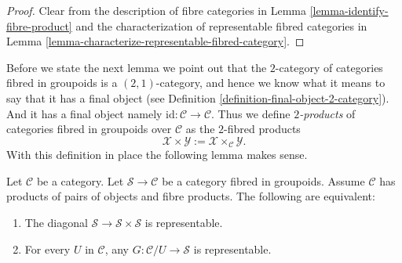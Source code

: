\begin{proof}
Clear from the description of fibre categories in
Lemma \ref{lemma-identify-fibre-product} and the characterization
of representable fibred categories in
Lemma \ref{lemma-characterize-representable-fibred-category}.
\end{proof}

\noindent
Before we state the next lemma we point out that the $2$-category
of categories fibred in groupoids is a $(2, 1)$-category, and hence
we know what it means to say that it has a final object (see
Definition \ref{definition-final-object-2-category}). And it has
a final object namely $\text{id} : \mathcal{C} \to \mathcal{C}$.
Thus we define {\it $2$-products} of categories fibred in groupoids
over $\mathcal{C}$ as the $2$-fibred products
$$
\mathcal{X} \times \mathcal{Y} :=
\mathcal{X} \times_\mathcal{C} \mathcal{Y}.
$$
With this definition in place the following lemma makes sense.

\begin{lemma}
\label{lemma-representable-diagonal-groupoids}
Let $\mathcal{C}$ be a category.
Let $\mathcal{S} \to \mathcal{C}$ be a category fibred in groupoids.
Assume $\mathcal{C}$ has products of pairs of objects and fibre products.
The following are equivalent:
\begin{enumerate}
\item The diagonal $\mathcal{S} \to \mathcal{S} \times \mathcal{S}$
is representable.
\item For every $U$ in $\mathcal{C}$, any $G : \mathcal{C}/U \to \mathcal{S}$
is representable.
\end{enumerate}
\end{lemma}

